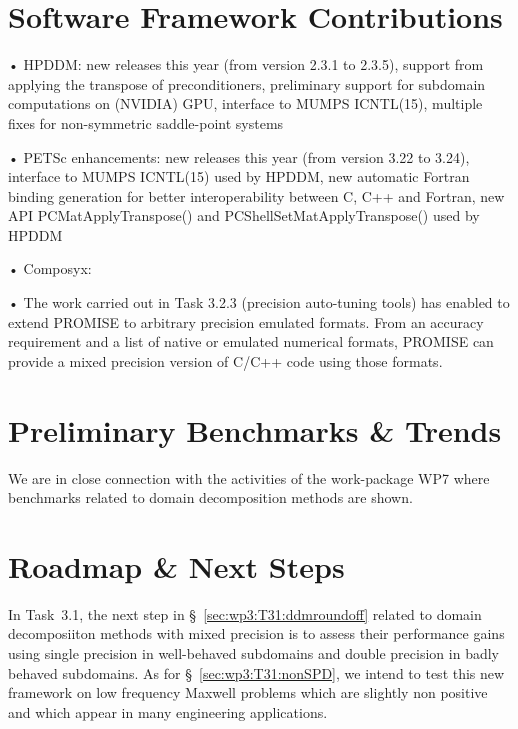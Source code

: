 \section{Software Framework Contributions}
 • HPDDM: new releases this year (from version 2.3.1 to 2.3.5), support from applying the transpose of preconditioners, preliminary support for subdomain computations on (NVIDIA) GPU, interface to MUMPS ICNTL(15), multiple fixes for non-symmetric saddle-point systems
 
 • PETSc enhancements: new releases this year (from version 3.22 to 3.24), interface to MUMPS ICNTL(15) used by HPDDM, new automatic Fortran binding generation for better interoperability between C, C++ and Fortran, new API PCMatApplyTranspose() and PCShellSetMatApplyTranspose() used by HPDDM
 
 • Composyx: %
 
 • %
The work carried out in Task 3.2.3 (precision auto-tuning tools) has enabled to extend PROMISE to arbitrary precision emulated formats. 
From an accuracy requirement and a list of native or emulated numerical formats, PROMISE can provide a mixed precision version of C/C++ code using those formats.

\section{Preliminary Benchmarks \& Trends}
We are in close connection with the activities of the work-package WP7 where benchmarks related to domain decomposition methods are shown. 

\section{Roadmap \& Next Steps}


In Task~3.1, the next step in \S~\ref{sec:wp3:T31:ddmroundoff} related to domain decomposiiton methods with mixed precision is to assess their performance gains using single precision in well-behaved subdomains and double precision in badly behaved subdomains. As for \S~\ref{sec:wp3:T31:nonSPD}, we intend to test this new framework on low frequency Maxwell problems which are slightly non positive and which appear in many engineering applications. 


